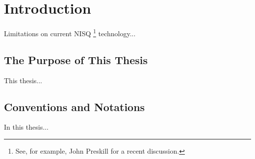 %
%
\chapter {Introduction}


Limitations on current NISQ%
\footnote{See, for example, John Preskill\cite{Preskill_2018} for a recent discussion.}
technology...

\section{The Purpose of This Thesis}

This thesis...

\section{Conventions and Notations}

In this thesis...
